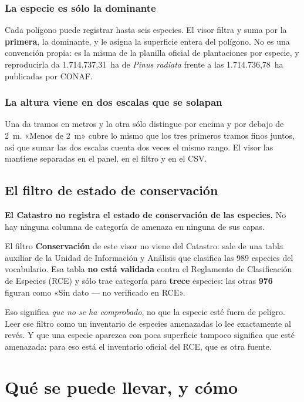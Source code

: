 \documentclass[11pt,a4paper]{report}
\newcommand{\campo}[1]{\textcolor{conaf}{\textbf{#1}}}
\begin{document}
\subsection{La especie es sólo la dominante}
Cada polígono puede registrar hasta seis especies. El visor filtra y suma por la
\campo{primera}, la dominante, y le asigna la superficie entera del polígono. No
es una convención propia: es la misma de la planilla oficial de plantaciones por
especie, y reproducirla da 1.714.737,31~ha de \emph{Pinus radiata} frente a las
1.714.736,78~ha publicadas por CONAF.

\subsection{La altura viene en dos escalas que se solapan}
Una da tramos en metros y la otra sólo distingue por encima y por debajo de
2~m. «Menos de 2~m» cubre lo mismo que los tres primeros tramos finos juntos,
así que sumar las dos escalas cuenta dos veces el mismo rango. El visor las
mantiene separadas en el panel, en el filtro y en el CSV.

\section{El filtro de estado de conservación}
\label{sec:conservacion}

\begin{alerta}
\campo{El Catastro no registra el estado de conservación de las especies.} No
hay ninguna columna de categoría de amenaza en ninguna de sus capas.

El filtro \campo{Conservación} de este visor no viene del Catastro: sale de una
tabla auxiliar de la Unidad de Información y Análisis que clasifica las 989
especies del vocabulario. Esa tabla \campo{no está validada} contra el
Reglamento de Clasificación de Especies (RCE) y sólo trae categoría para
\textbf{trece} especies: las otras \textbf{976} figuran como «Sin dato --- no
verificado en RCE».

Eso significa \emph{que no se ha comprobado}, no que la especie esté fuera de
peligro. Leer ese filtro como un inventario de especies amenazadas lo lee
exactamente al revés. Y que una especie aparezca con poca superficie tampoco
significa que esté amenazada: para eso está el inventario oficial del RCE, que
es otra fuente.
\end{alerta}

\chapter{Qué se puede llevar, y cómo}
\end{document}
